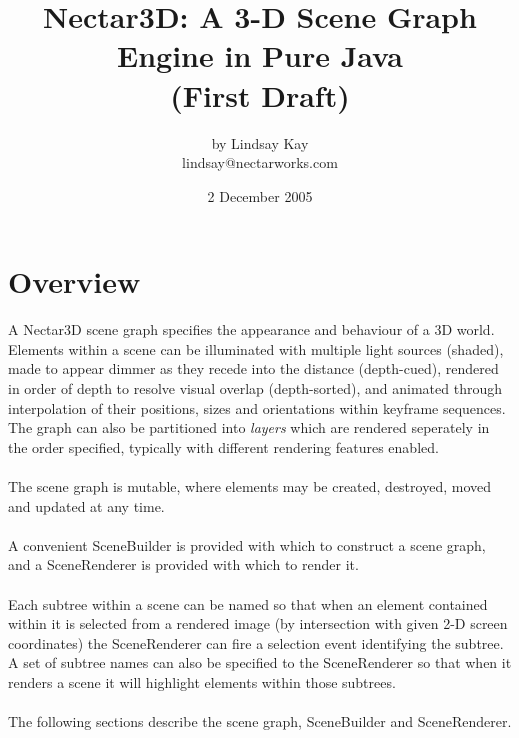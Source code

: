 \documentclass[10pt,aps, prb,preprint]{article}
\begin{document}
               
\title{Nectar3D: A 3-D Scene Graph Engine in Pure Java\\(First Draft)}
\author{by Lindsay Kay\\lindsay@nectarworks.com}
\date{2 December 2005}
\maketitle

\newpage
\tableofcontents
\newpage
\section{Overview}


A Nectar3D scene graph specifies the appearance and behaviour of a 3D world. Elements within a scene can be illuminated with multiple light sources (shaded), made to appear dimmer as they recede into the distance (depth-cued), rendered in order of depth to resolve visual overlap (depth-sorted), and animated through interpolation of their positions, sizes and orientations within keyframe sequences.  The graph can also be partitioned into \textit{layers} which are rendered seperately in the order specified, typically with different rendering features enabled. 
\\
\\
The scene graph is mutable, where elements may be created, destroyed, moved and updated at any time.
\\
\\
A convenient SceneBuilder is provided with which to construct a scene graph, and a SceneRenderer is provided with which to render it. 
\\
\\
Each subtree within a scene can be named so that when an element contained within it is selected from a rendered image (by intersection with given 2-D screen coordinates) the SceneRenderer can fire a selection event identifying the subtree. A set of subtree names can also be specified to the SceneRenderer so that when it renders a scene it will highlight elements within those subtrees. 
\\
\\
The following sections describe the scene graph, SceneBuilder and SceneRenderer.
\end{document}

